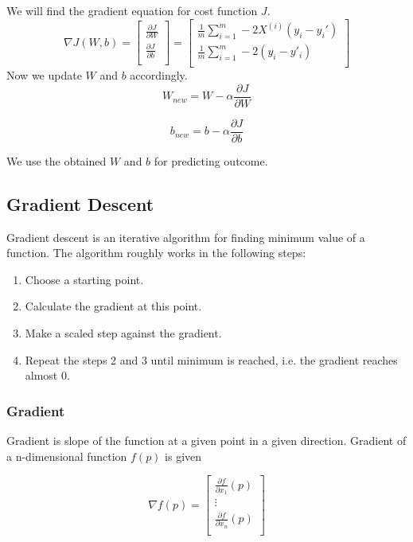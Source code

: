 We will find the gradient equation for cost function $J$.
\begin{equation}
    \nabla J(W,b) = \begin{bmatrix}
        \frac{\partial J}{\partial W} \\
        \frac{\partial J}{\partial b} \\
    \end{bmatrix}
    =
    \begin{bmatrix}
        \frac{1}{m} \sum_{i=1}^{m} -2X^{(i)}(y_i-y_i') \\
        \frac{1}{m} \sum_{i=1}^{m} -2(y_i-y'_i) \\
    \end{bmatrix}
\end{equation}
Now we update $W$ and $b$ accordingly.
\begin{equation}
    W_{new} = W - \alpha \frac{\partial J}{\partial W}
\end{equation}

\begin{equation}
    b_{new} = b - \alpha \frac{\partial J}{\partial b}
\end{equation}

We use the obtained $W$ and $b$ for predicting outcome.

\subsection{Gradient Descent}
Gradient descent is an iterative algorithm for finding minimum value of a function.
The algorithm roughly works in the following steps:
\begin{enumerate}
    \item Choose a starting point.
    \item Calculate the gradient at this point.
    \item Make a scaled step against the gradient.
    \item Repeat the steps 2 and 3 until minimum is reached, i.e. the gradient reaches almost 0.
\end{enumerate}

\subsubsection{Gradient}
Gradient is slope of the function at a given point in a given direction. Gradient of a n-dimensional 
function $f(p)$ is given 

\begin{equation}
    \nabla f(p) = \begin{bmatrix}
        \frac{\partial f}{\partial x_{1}}(p) \\
        \vdots \\
        \frac{\partial f}{\partial x_{n}}(p) \\
    \end{bmatrix}
\end{equation}

